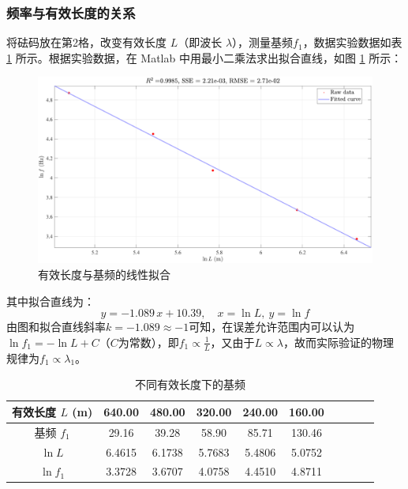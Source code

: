 \documentclass[UTF8]{article}
\theoremstyle{MyLineTheoremStyle} %
\theoremstyle{MyBlockTheoremStyle} %
\theoremstyle{MySubsubsectionStyle} %
\begin{document}
\subsubsection{频率与有效长度的关系}
将砝码放在第2格，改变有效长度 $L$（即波长 $\lambda$），测量基频$ f_1 $，数据实验数据如表 \ref{不同有效长度下的基频} 所示。根据实验数据，在 Matlab 中用最小二乘法求出拟合直线，如图 \ref{有效长度与基频的线性拟合} 所示：
\begin{figure}[H]\centering
    \includegraphics[width=0.9\columnwidth]{assets/3.pdf}
    \caption{有效长度与基频的线性拟合}
    \label{有效长度与基频的线性拟合}
\end{figure}
其中拟合直线为：
\begin{equation}
y = -1.089 \,x + 10.39,\quad x = \ln L,\ y = \ln f
\end{equation}
由图和拟合直线斜率$ k=-1.089\approx-1 $可知，在误差允许范围内可以认为$ \ln f_1=-\ln L+C $（$ C $为常数），即$ f_1\propto\frac1L $，又由于$ L\propto\lambda $，故而实际验证的物理规律为$ f_1\propto\lambda_1 $。

\begin{table}[H]\centering
    \caption{不同有效长度下的基频}
    \label{不同有效长度下的基频}
\begin{tabular}{cccccccccc}\toprule
    有效长度 $L$ (m) & 640.00 & 480.00 & 320.00 & 240.00 & 160.00 \\
    \midrule
    基频 $f_1$ & 29.16  & 39.28  & 58.90  & 85.71  & 130.46 \\
    $\ln L$ & 6.4615  &  6.1738  &  5.7683  &  5.4806  &  5.0752 \\
    $\ln f_1$ & 3.3728  &  3.6707  &  4.0758  &  4.4510  &  4.8711 \\
    \bottomrule
\end{tabular}
\end{table}
\end{document}
